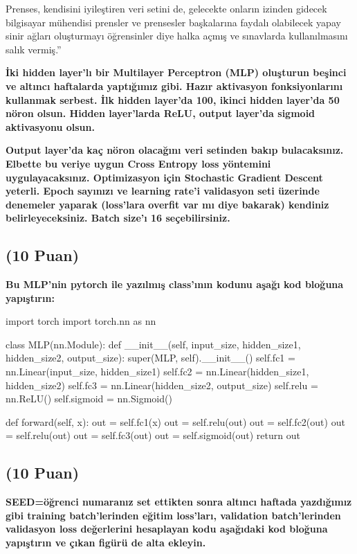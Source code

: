 \documentclass[11pt]{article}
\begin{document}
Prenses, kendisini iyileştiren veri setini de, gelecekte onların izinden gidecek bilgisayar mühendisi prensler ve prensesler başkalarına faydalı olabilecek yapay sinir ağları oluşturmayı öğrensinler diye halka açmış ve sınavlarda kullanılmasını salık vermiş.''

\textbf{İki hidden layer'lı bir Multilayer Perceptron (MLP) oluşturun beşinci ve altıncı haftalarda yaptığımız gibi. Hazır aktivasyon fonksiyonlarını kullanmak serbest. İlk hidden layer'da 100, ikinci hidden layer'da 50 nöron olsun. Hidden layer'larda ReLU, output layer'da sigmoid aktivasyonu olsun.}

\textbf{Output layer'da kaç nöron olacağını veri setinden bakıp bulacaksınız. Elbette bu veriye uygun Cross Entropy loss yöntemini uygulayacaksınız. Optimizasyon için Stochastic Gradient Descent yeterli. Epoch sayınızı ve learning rate'i validasyon seti üzerinde denemeler yaparak (loss'lara overfit var mı diye bakarak) kendiniz belirleyeceksiniz. Batch size'ı 16 seçebilirsiniz.}

\subsection{(10 Puan)} \textbf{Bu MLP'nin pytorch ile yazılmış class'ının kodunu aşağı kod bloğuna yapıştırın:}

\begin{python}
import torch
import torch.nn as nn

class MLP(nn.Module):
    def __init__(self, input_size, hidden_size1, hidden_size2, output_size):
        super(MLP, self).__init__()
        self.fc1 = nn.Linear(input_size, hidden_size1)
        self.fc2 = nn.Linear(hidden_size1, hidden_size2)
        self.fc3 = nn.Linear(hidden_size2, output_size)
        self.relu = nn.ReLU()
        self.sigmoid = nn.Sigmoid()
        
    def forward(self, x):
        out = self.fc1(x)
        out = self.relu(out)
        out = self.fc2(out)
        out = self.relu(out)
        out = self.fc3(out)
        out = self.sigmoid(out)
        return out

\end{python}

\subsection{(10 Puan)} \textbf{SEED=öğrenci numaranız set ettikten sonra altıncı haftada yazdığımız gibi training batch'lerinden eğitim loss'ları, validation batch'lerinden validasyon loss değerlerini hesaplayan kodu aşağıdaki kod bloğuna yapıştırın ve çıkan figürü de alta ekleyin.}
\end{document}
